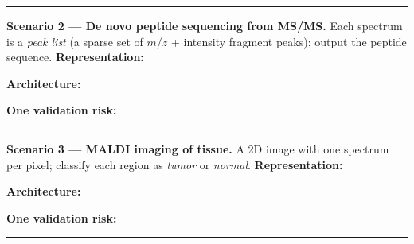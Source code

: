 \documentclass[11pt]{article}
\newif\ifsolution
\newcommand{\keybox}[1]{\ifsolution\par\vspace{2pt}%
  \fbox{\parbox{0.965\textwidth}{\small\textbf{Suggested answer.}\; #1}}\par\fi}
\newcommand{\work}[1]{\ifsolution\else\vspace{#1}\fi}
\newcommand{\fillrow}[2]{\textbf{#1:}\ \ifsolution\textbf{#2}\else\hrulefill\fi\par}
\begin{document}
\vspace{2pt}\hrule\vspace{4pt}

\textbf{Scenario 2 --- De novo peptide sequencing from MS/MS.}\; {\small Each spectrum is a \emph{peak list}
(a sparse set of $m/z$ + intensity fragment peaks); output the peptide sequence.}
\vspace{2pt}
\fillrow{Representation}{peak-as-token set (each peak $\to$ one token: $m/z$ + intensity)}\work{0.35cm}
\fillrow{Architecture}{Transformer encoder--decoder (Casanovo family, Lecture 8)}\work{0.35cm}
\fillrow{One validation risk}{shift across instruments / fragmentation settings --- validate on a different instrument type; avoid homologous-peptide leakage}\work{0.35cm}
\keybox{Sparse peak list $\to$ \textbf{peak-as-token} $\to$ \textbf{Transformer} (chart row 2; the Casanovo recipe --- read spectrum,
write peptide). \textbf{Risk:} fragmentation/instrument \emph{distribution shift} --- validate on a different instrument type, and split so
\emph{homologous} peptides don't leak between train and test.}

\vspace{2pt}\hrule\vspace{4pt}

\textbf{Scenario 3 --- MALDI imaging of tissue.}\; {\small A 2D image with one spectrum per pixel; classify
each region as \emph{tumor} or \emph{normal}.}
\vspace{2pt}
\fillrow{Representation}{image --- pixel grid / patches (ion images or per-pixel spectra as channels)}\work{0.35cm}
\fillrow{Architecture}{2D CNN or ViT (Lecture 5/8)}\work{0.35cm}
\fillrow{One validation risk}{data leakage if pixels of the same slide/patient are split across train and test --- split by patient, validate on held-out patients}\work{0.35cm}
\keybox{A genuine 2D image $\to$ \textbf{patches/pixel grid} $\to$ \textbf{2D CNN or ViT} (chart row 3). \textbf{Risk:} \emph{data leakage} ---
pixels from one slide are highly correlated, so splitting pixels of the \emph{same} slide/patient into train and test massively
over-states accuracy; split by \emph{patient/slide} and validate on held-out patients across staining batches.}

\vspace{2pt}\hrule\vspace{4pt}
\end{document}
